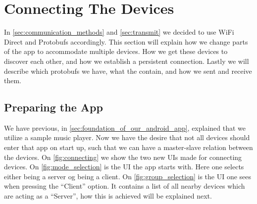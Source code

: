 \section{Connecting The Devices}
In \cref{sec:communication_methods} and \cref{sec:transmit} we decided to use WiFi Direct and Protobufs accordingly.
This section will explain how we change parts of the app to accommodate multiple devices.
How we get these devices to discover each other, and how we establish a persistent connection.
Lastly we will describe which protobufs we have, what the contain, and how we sent and receive them.

\subsection{Preparing the App}
We have previous, in \cref{sec:foundation_of_our_android_app}, explained that we utilize a sample music player.
Now we have the desire that not all devices should enter that app on start up, such that we can have a master-slave relation between the devices.
On \cref{fig:connecting} we show the two new UIs made for connecting devices.
On \cref{fig:mode_selection} is the UI the app starts with.
Here one selects either being a server og being a client.
On \cref{fig:group_selection} is the UI one sees when pressing the ``Client'' option.
It contains a list of all nearby devices which are acting as a ``Server'', how this is achieved will be explained next.


